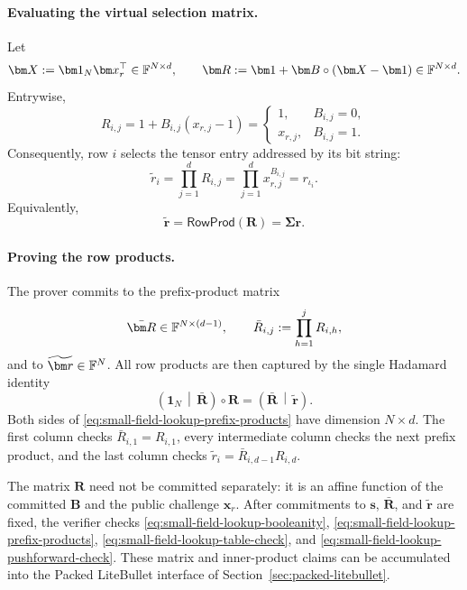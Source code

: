 \documentclass[runningheads]{llncs}
\begin{document}
\paragraph{Evaluating the virtual selection matrix.}
Let
\[
    \bm X:=\bm1_N\bm x_r^\top\in\Field^{N\times d},
    \qquad
    \bm R:=\bm1+\bm B\circ(\bm X-\bm1)
      \in\Field^{N\times d}.
\]
Entrywise,
\[
    R_{i,j}=1+B_{i,j}(x_{r,j}-1)
      =
      \begin{cases}
        1,&B_{i,j}=0,\\
        x_{r,j},&B_{i,j}=1.
      \end{cases}
\]
Consequently, row \(i\) selects the tensor entry addressed by its bit
string:
\begin{equation}
    \widetilde r_i
      =\prod_{j=1}^{d}R_{i,j}
      =\prod_{j=1}^{d}x_{r,j}^{B_{i,j}}
      =r_{\iota_i}.
\label{eq:small-field-lookup-row-product}
\end{equation}
Equivalently,
\[
    \widetilde{\bm r}
      =\mathsf{RowProd}(\bm R)
      =\bm\Sigma\bm r.
\]

\paragraph{Proving the row products.}
The prover commits to the prefix-product matrix
\[
    \bar{\bm R}\in\Field^{N\times(d-1)},
    \qquad
    \bar R_{i,j}:=\prod_{h=1}^{j}R_{i,h},
\]
and to \(\widetilde{\bm r}\in\Field^N\).  All row products are then
captured by the single Hadamard identity
\begin{equation}
    \boxed{
    \left(\bm1_N\,\middle|\,\bar{\bm R}\right)
      \circ\bm R
      =
    \left(\bar{\bm R}\,\middle|\,\widetilde{\bm r}\right).}
\label{eq:small-field-lookup-prefix-products}
\end{equation}
Both sides of \eqref{eq:small-field-lookup-prefix-products} have
dimension \(N\times d\).  The first column checks
\(\bar R_{i,1}=R_{i,1}\), every intermediate column checks the next
prefix product, and the last column checks
\(\widetilde r_i=\bar R_{i,d-1}R_{i,d}\).

The matrix \(\bm R\) need not be committed separately: it is an affine
function of the committed \(\bm B\) and the public challenge
\(\bm x_r\).  After commitments to \(\bm s\),
\(\bar{\bm R}\), and \(\widetilde{\bm r}\) are fixed, the verifier
checks
\eqref{eq:small-field-lookup-booleanity},
\eqref{eq:small-field-lookup-prefix-products},
\eqref{eq:small-field-lookup-table-check}, and
\eqref{eq:small-field-lookup-pushforward-check}.  These matrix and
inner-product claims can be accumulated into the Packed LiteBullet
interface of Section~\ref{sec:packed-litebullet}.
\end{document}

